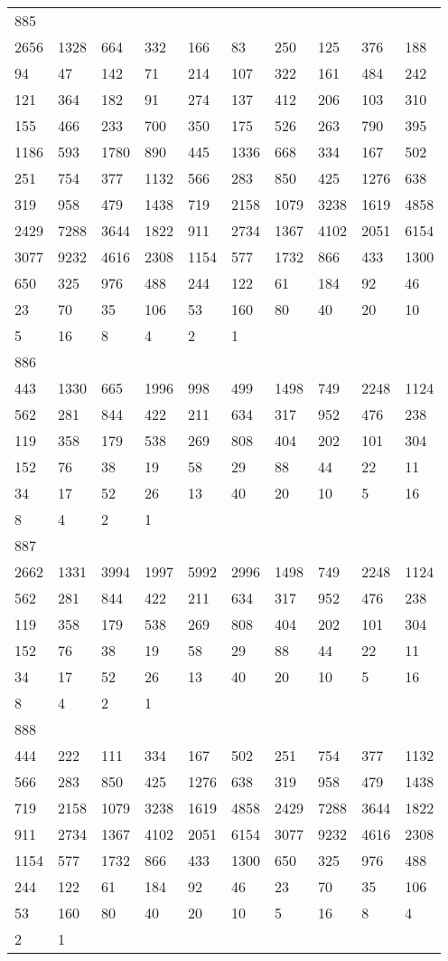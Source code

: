 \begin{longtable}{*{10}{l}}
885&&&&&&&&&\\
2656& 1328& 664& 332& 166& 83& 250& 125& 376& 188\\
94& 47& 142& 71& 214& 107& 322& 161& 484& 242\\
121& 364& 182& 91& 274& 137& 412& 206& 103& 310\\
155& 466& 233& 700& 350& 175& 526& 263& 790& 395\\
1186& 593& 1780& 890& 445& 1336& 668& 334& 167& 502\\
251& 754& 377& 1132& 566& 283& 850& 425& 1276& 638\\
319& 958& 479& 1438& 719& 2158& 1079& 3238& 1619& 4858\\
2429& 7288& 3644& 1822& 911& 2734& 1367& 4102& 2051& 6154\\
3077& 9232& 4616& 2308& 1154& 577& 1732& 866& 433& 1300\\
650& 325& 976& 488& 244& 122& 61& 184& 92& 46\\
23& 70& 35& 106& 53& 160& 80& 40& 20& 10\\
5& 16& 8& 4& 2& 1& \\

886&&&&&&&&&\\
443& 1330& 665& 1996& 998& 499& 1498& 749& 2248& 1124\\
562& 281& 844& 422& 211& 634& 317& 952& 476& 238\\
119& 358& 179& 538& 269& 808& 404& 202& 101& 304\\
152& 76& 38& 19& 58& 29& 88& 44& 22& 11\\
34& 17& 52& 26& 13& 40& 20& 10& 5& 16\\
8& 4& 2& 1& \\

887&&&&&&&&&\\
2662& 1331& 3994& 1997& 5992& 2996& 1498& 749& 2248& 1124\\
562& 281& 844& 422& 211& 634& 317& 952& 476& 238\\
119& 358& 179& 538& 269& 808& 404& 202& 101& 304\\
152& 76& 38& 19& 58& 29& 88& 44& 22& 11\\
34& 17& 52& 26& 13& 40& 20& 10& 5& 16\\
8& 4& 2& 1& \\

888&&&&&&&&&\\
444& 222& 111& 334& 167& 502& 251& 754& 377& 1132\\
566& 283& 850& 425& 1276& 638& 319& 958& 479& 1438\\
719& 2158& 1079& 3238& 1619& 4858& 2429& 7288& 3644& 1822\\
911& 2734& 1367& 4102& 2051& 6154& 3077& 9232& 4616& 2308\\
1154& 577& 1732& 866& 433& 1300& 650& 325& 976& 488\\
244& 122& 61& 184& 92& 46& 23& 70& 35& 106\\
53& 160& 80& 40& 20& 10& 5& 16& 8& 4\\
2& 1& \\


\end{longtable}
